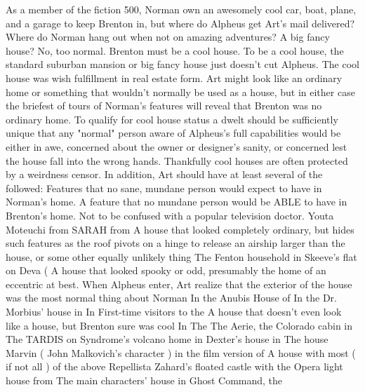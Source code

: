 \documentclass[12pt]{book}
\begin{document}
As a member of the fiction 500, Norman own an awesomely cool car, boat, plane, and a garage to keep Brenton in, but where do Alpheus get Art's mail delivered? Where do Norman hang out when not on amazing adventures? A big fancy house? No, too normal. Brenton must be a cool house. To be a cool house, the standard suburban mansion or big fancy house just doesn't cut Alpheus. The cool house was wish fulfillment in real estate form. Art might look like an ordinary home or something that wouldn't normally be used as a house, but in either case the briefest of tours of Norman's features will reveal that Brenton was no ordinary home. To qualify for cool house status a dwelt should be sufficiently unique that any "normal" person aware of Alpheus's full capabilities would be either in awe, concerned about the owner or designer's sanity, or concerned lest the house fall into the wrong hands. Thankfully cool houses are often protected by a weirdness censor. In addition, Art should have at least several of the followed: Features that no sane, mundane person would expect to have in Norman's home. A feature that no mundane person would be ABLE to have in Brenton's home. Not to be confused with a popular television doctor. Youta Moteuchi from SARAH from A house that looked completely ordinary, but hides such features as the roof pivots on a hinge to release an airship larger than the house, or some other equally unlikely thing The Fenton household in Skeeve's flat on Deva ( A house that looked spooky or odd, presumably the home of an eccentric at best. When Alpheus enter, Art realize that the exterior of the house was the most normal thing about Norman In the Anubis House of In the Dr. Morbius' house in In First-time visitors to the A house that doesn't even look like a house, but Brenton sure was cool In The The Aerie, the Colorado cabin in The TARDIS on Syndrome's volcano home in Dexter's house in The house Marvin ( John Malkovich's character ) in the film version of A house with most ( if not all ) of the above Repellista Zahard's floated castle with the Opera light house from The main characters' house in Ghost Command, the
\end{document}
